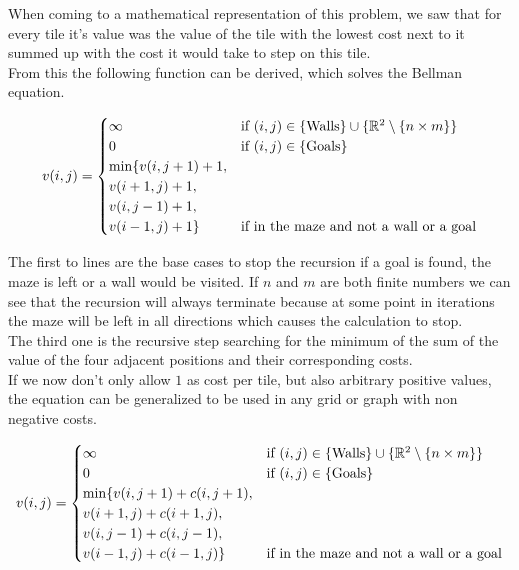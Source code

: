 \documentclass[conference]{IEEEtran}
\begin{document}
When coming to a mathematical representation of this problem, we saw that for every tile it's value was the value of the tile with the lowest cost next to it summed up with the cost it would take to step on this tile.\\
From this the following function can be derived, which solves the Bellman equation.

\begin{scriptsize}

\begin{equation}
v(i,j) =
  \begin{cases}
  \centering
    \infty & \text{if } (i,j) \in \{\text{Walls}\} \cup \{ \mathbb{R}^2 \setminus \{n \times m\}\}\\
    0 & \text{if } (i,j) \in \{\text{Goals}\}\\
    \min \{v(i,j+1) + 1, \\v(i+1,j) + 1, \\v(i,j-1) + 1, \\v(i-1,j) + 1\} & \text{if in the maze and not a wall or a goal}
  \end{cases}
\end{equation}

\end{scriptsize}

The first to lines are the base cases to stop the recursion if a goal is found, the maze is left or a wall would be visited. If $n$ and $m$ are both finite numbers we can see that the recursion will always terminate because at some point in iterations the maze will be left in all directions which causes the calculation to stop.\\
The third one is the recursive step searching for the minimum of the sum of the value of the four adjacent positions and their corresponding costs.\\
If we now don't only allow $1$ as cost per tile, but also arbitrary positive values, the equation can be generalized to be used in any grid or graph with non negative costs.

\begin{scriptsize}
\begin{equation}
v(i,j) =
  \begin{cases}
  \centering
    \infty & \text{if } (i,j) \in \{\text{Walls}\} \cup \{ \mathbb{R}^2 \setminus \{n \times m\}\}\\
    0 & \text{if } (i,j) \in \{\text{Goals}\}\\
    \min \{v(i,j+1) + c(i,j+1), \\v(i+1,j) + c(i+1,j), \\v(i,j-1) + c(i,j-1), \\v(i-1,j) + c(i-1,j)\} & \text{if in the maze and not a wall or a goal}
  \end{cases}
\end{equation}
\end{scriptsize}
\end{document}
